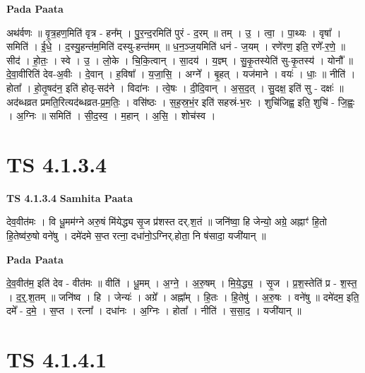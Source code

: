 \documentclass[17pt]{extarticle}
\begin{document}
\textbf{Pada Paata} \newline

अथ॑र्वणः ॥ वृ॒त्र॒हण॒मिति॑ वृत्र - हन᳚म् । पु॒र॒न्द॒रमिति॑ पुरं - द॒रम् ॥ तम् । उ॒ । त्वा॒ । पा॒थ्यः । वृषा᳚ । समिति॑ । ई॒धे॒ । द॒स्यु॒हन्त॑म॒मिति॑ दस्यु-हन्त॑मम् ॥ ध॒न॒ञ्ज॒यमिति॑ धनं - ज॒यम् । रणे॑रण॒ इति॒ रणे᳚-र॒णे॒ ॥ सीद॑ । हो॒तः॒ । स्वे । उ॒ । लो॒के । चि॒कि॒त्वान् । सा॒दय॑ । य॒ज्ञ्म् । सु॒कृ॒तस्येति॑ सु-कृ॒तस्य॑ । योनौ᳚ ॥ दे॒वा॒वीरिति॑ देव-अ॒वीः । दे॒वान् । ह॒विषा᳚ । य॒जा॒सि॒ । अग्ने᳚ । बृ॒हत् । यज॑माने । वयः॑ । धाः॒ ॥ नीति॑ । होता᳚ । हो॒तृ॒षद॑न॒ इति॑ होतृ-सद॑ने । विदा॑नः । त्वे॒षः । दी॒दि॒वान् । अ॒स॒द॒त् । सु॒दक्ष॒ इति॑ सु - दक्षः॑ ॥ अद॑ब्धव्रत प्रमति॒रित्यद॑ब्धव्रत-प्र॒म॒तिः॒ । वसि॑ष्ठः । स॒ह॒स्र॒भं॒र इति॑ सहस्रं-भ॒रः । शुचि॑जिह्व॒ इति॒ शुचि॑ - जि॒ह्वः॒ । अ॒ग्निः ॥ समिति॑ । सी॒द॒स्व॒ । म॒हान् । अ॒सि॒ । शोच॑स्व ।  \newline




\section*{ TS 4.1.3.4 }

\textbf{TS 4.1.3.4 } \newline
\textbf{Samhita Paata} \newline

देव॒वीत॑मः । वि धू॒मम॑ग्ने अरु॒षं मि॑येद्ध्य सृ॒ज प्र॑शस्त दर्.श॒तं ॥ जनि॑ष्वा॒ हि जेन्यो॒ अग्रे॒ अह्नाꣳ॑ हि॒तो हि॒तेष्व॑रु॒षो वने॑षु । दमे॑दमे स॒प्त रत्ना॒ दधा॑नो॒ऽग्निर्.होता॒ नि ष॑सादा॒ यजी॑यान् ॥ \newline

\textbf{Pada Paata} \newline

दे॒व॒वीत॑म॒ इति॑ देव - वीत॑मः ॥ वीति॑ । धू॒मम् । अ॒ग्ने॒ । अ॒रु॒षम् । मि॒ये॒द्ध्य॒ । सृ॒ज । प्र॒श॒स्तेति॑ प्र - श॒स्त॒ । द॒र्॒.श॒तम् ॥ जनि॑ष्व । हि । जेन्यः॑ । अग्रे᳚ । अह्ना᳚म् । हि॒तः । हि॒तेषु॑ । अ॒रु॒षः । वने॑षु ॥ दमे॑दम॒ इति॒ दमे᳚ - द॒मे॒ । स॒प्त । रत्ना᳚ । दधा॑नः । अ॒ग्निः । होता᳚ । नीति॑ । स॒सा॒द॒ । यजी॑यान् ॥  \newline




\section*{ TS 4.1.4.1 }
\end{document}
